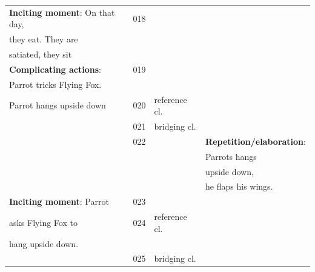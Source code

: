 \documentclass[output=paper]{LSP/langsci}
\begin{document}
\begin{table}[]
\begin{tabular}{llll}
\textbf{Inciting moment}: On that day,               & 018               &                 &                                              \\
they eat. They are                                      &                   &                 &                                              \\
satiated, they sit                    &                   &                 &                                              \\
\textbf{Complicating actions}:                         & 019               &                 &                                              \\
Parrot tricks Flying Fox.                      &                   &                 &                                              \\
Parrot hangs upside down                            & 020               & reference cl.                &                                              \\
                                                 & 021               & bridging cl. &                                              \\
                                                 & 022          &                 & \textbf{Repetition/elaboration}:       \\
                                          &                   &                 & Parrots  hangs               \\
                                            &                   &                 & upside down,               \\                                        
                                                        &                   &                 & he flaps his wings.              \\                                                                      
\textbf{Inciting moment}: Parrot                    & 023          &                 &                                              \\
asks Flying Fox to                        &         024          &  reference cl.               &                                              \\
hang upside down.                         &                   &                 &                                              \\
                                       & 025               & bridging cl. &                                              \\

\end{tabular}
\end{table}
\end{document}
